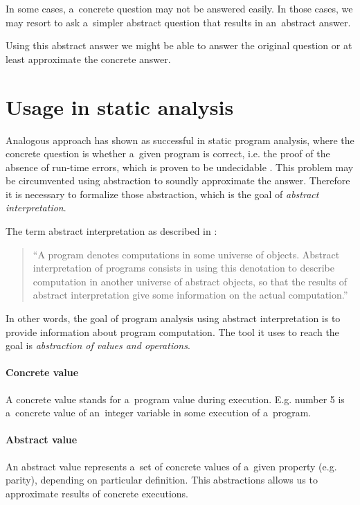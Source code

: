 \documentclass[12pt,oneside]{fithesis2}
\theoremstyle{definition}
\begin{document}
In some cases, a~concrete question may not be answered easily. In those cases, we may resort to ask a~simpler abstract question that results in an~abstract answer.

Using this abstract answer we might be able to answer the original question or at least approximate the concrete answer. \cite{CousotCousot04-WCC}

\section{Usage in static analysis}

Analogous approach has shown as successful in static program analysis, where the concrete question is whether a~given program is correct, i.e. the proof of the absence of run-time errors, which is proven to be undecidable \cite{mine-AIAA10}. This problem may be circumvented using abstraction to soundly approximate the answer. Therefore it is necessary to formalize those abstraction, which is the goal of \textit{abstract interpretation}.

The term abstract interpretation as described in \cite{CousotCousot77-1}:

\begin{quotation}
``A program denotes computations in some universe of objects. Abstract interpretation of programs consists in using this denotation to describe computation in another universe of abstract objects, so that the results of abstract interpretation give some information on the actual computation.''
\end{quotation}

In other words, the goal of program analysis using abstract interpretation is to provide information about program computation. The tool it uses to reach the goal is \textit{abstraction of values and operations}.

\paragraph{Concrete value}
A concrete value stands for a~program value during execution. E.g. number 5 is a~concrete value of an~integer variable in some execution of a~program.

\paragraph{Abstract value}
An abstract value represents a~set of concrete values of a~given property (e.g. parity), depending on particular definition. This abstractions allows us to approximate results of concrete executions.
\end{document}
